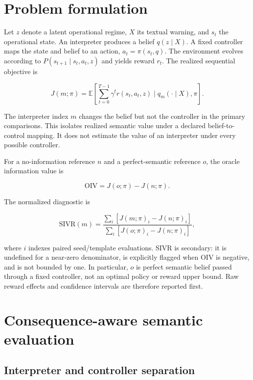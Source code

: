 \documentclass[10pt]{article}
\begin{document}
\section{Problem formulation}

Let $z$ denote a latent operational regime, $X$ its textual warning, and $s_t$ the operational state. An interpreter produces a belief $q(z\mid X)$. A fixed controller maps the state and belief to an action, $a_t=\pi(s_t,q)$. The environment evolves according to $P(s_{t+1}\mid s_t,a_t,z)$ and yields reward $r_t$. The realized sequential objective is

\begin{equation}
J(m;\pi)=\mathbb{E}\left[\sum_{t=0}^{T-1}\gamma^t r(s_t,a_t,z)\mid q_m(\cdot\mid X),\pi\right].
\end{equation}

The interpreter index $m$ changes the belief but not the controller in the primary comparisons. This isolates realized semantic value under a declared belief-to-control mapping. It does not estimate the value of an interpreter under every possible controller.

For a no-information reference $n$ and a perfect-semantic reference $o$, the oracle information value is

\begin{equation}
\mathrm{OIV}=J(o;\pi)-J(n;\pi).
\end{equation}

The normalized diagnostic is

\begin{equation}
\mathrm{SIVR}(m)=\frac{\sum_i[J(m;\pi)_i-J(n;\pi)_i]}{\sum_i[J(o;\pi)_i-J(n;\pi)_i]},
\end{equation}

where $i$ indexes paired seed/template evaluations. SIVR is secondary: it is undefined for a near-zero denominator, is explicitly flagged when OIV is negative, and is not bounded by one. In particular, $o$ is perfect semantic belief passed through a fixed controller, not an optimal policy or reward upper bound. Raw reward effects and confidence intervals are therefore reported first.

\section{Consequence-aware semantic evaluation}

\subsection{Interpreter and controller separation}
\end{document}
